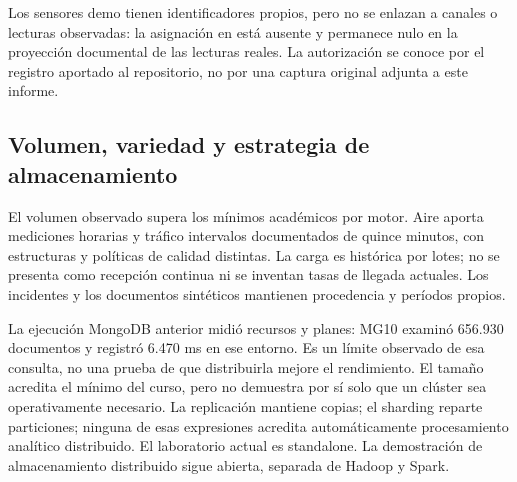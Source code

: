 Los sensores demo tienen identificadores propios, pero no se enlazan a canales
o lecturas observadas: la asignación en  está ausente y
 permanece nulo en la proyección documental de las lecturas reales.
La autorización se conoce por el registro
aportado al repositorio, no por una captura original adjunta a este informe.


\subsection{Volumen, variedad y estrategia de almacenamiento}
El volumen observado supera los mínimos académicos por motor. Aire aporta
mediciones horarias y tráfico intervalos documentados de quince minutos, con
estructuras y políticas de calidad distintas. La carga es histórica por lotes;
no se presenta como recepción continua ni se inventan tasas de llegada actuales.
Los incidentes y los documentos sintéticos mantienen procedencia y períodos propios.

La ejecución MongoDB anterior midió recursos y planes: MG10 examinó 656.930
documentos y registró 6.470 ms en ese entorno. Es un límite observado de esa
consulta, no una prueba de que distribuirla mejore el rendimiento. El tamaño
acredita el mínimo del curso, pero no demuestra por sí solo que un clúster sea
operativamente necesario. La replicación mantiene copias; el sharding reparte
particiones; ninguna de esas expresiones acredita automáticamente procesamiento
analítico distribuido. El laboratorio actual es standalone. La demostración de
almacenamiento distribuido sigue abierta, separada de Hadoop y Spark.
